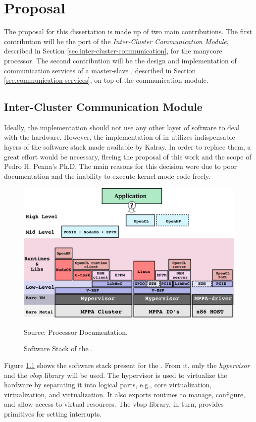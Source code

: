 \chapter{Proposal}
\label{ch.proposal}

The proposal for this dissertation is made up of two main contributions.
The first contribution will be the port of the \textit{Inter-Cluster Communication Module},
described in Section \ref{sec.inter-cluster-communication}, for the \mppa manycore processor.
The second contribution will be the design and implementation of communication services
of a master-slave \os, described in Section \ref{sec.communication-services}, on top of
the communication module.

\section{Inter-Cluster Communication Module}

	Ideally, the \hal implementation should not use any other layer of software to
	deal with the hardware. However, the implementation of \hal in \mppa utilizes
	indispensable layers of the software stack made available by Kalray.
	In order to replace them, a great effort would be necessary, fleeing the proposal
	of this work and the scope of Pedro H. Penna's Ph.D.
	The main reasons for this decision were due to poor documentation and the
	inability to execute kernel mode code freely.


	\begin{figure}[t]
		\centering
		\caption{Software Stack of the \mppa.}

		\includegraphics[width=.7\textwidth]{images/software-stack.png}

		Source: \mppa Processor Documentation.

		\label{fig.software-stack}
	\end{figure}

	Figure \ref{fig.software-stack} shows the software stack present for the \mppa.
	From it, only the \textit{hypervisor} and the \textit{vbsp} library will be used.
	The hypervisor is used to virtualize the hardware by separating it into logical
	parts, e.g., core virtualization, \cnoc virtualization, and \dnoc virtualization.
	It also exports routines to manage, configure, and allow access to virtual resources.
	The vbsp library, in turn, provides primitives for setting interrupts.

